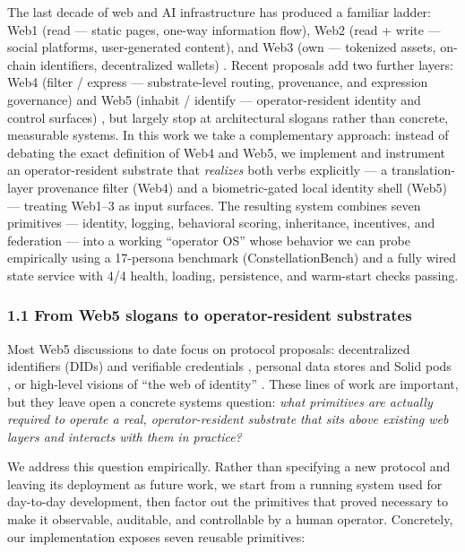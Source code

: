 The last decade of web and AI infrastructure has produced a familiar
ladder: Web1 (read --- static pages, one-way information flow), Web2
(read + write --- social platforms, user-generated content), and Web3
(own --- tokenized assets, on-chain identifiers, decentralized wallets)
\citep{bernerslee1989, oconnor2023web4}. Recent proposals add two
further layers: Web4 (filter / express --- substrate-level routing,
provenance, and expression governance) and Web5 (inhabit / identify ---
operator-resident identity and control surfaces)
\citep{tbd_web5, solid_pods, ssi_survey}, but largely stop at
architectural slogans rather than concrete, measurable systems. In this
work we take a complementary approach: instead of debating the exact
definition of Web4 and Web5, we implement and instrument an
operator-resident substrate that \emph{realizes} both verbs explicitly
--- a translation-layer provenance filter (Web4) and a biometric-gated
local identity shell (Web5) --- treating Web1--3 as input surfaces. The
resulting system combines seven primitives --- identity, logging,
behavioral scoring, inheritance, incentives, and federation --- into a
working ``operator OS'' whose behavior we can probe empirically using a
17-persona benchmark (ConstellationBench) and a fully wired state
service with 4/4 health, loading, persistence, and warm-start checks
passing.

\subsubsection{1.1 From Web5 slogans to operator-resident
substrates}\label{from-web5-slogans-to-operator-resident-substrates}

Most Web5 discussions to date focus on protocol proposals: decentralized
identifiers (DIDs) and verifiable credentials \citep{w3c_did_core},
personal data stores and Solid pods \citep{solid_pods}, or high-level
visions of ``the web of identity'' \citep{tbd_web5}. These lines of work
are important, but they leave open a concrete systems question:
\emph{what primitives are actually required to operate a real,
operator-resident substrate that sits above existing web layers and
interacts with them in practice?}

We address this question empirically. Rather than specifying a new
protocol and leaving its deployment as future work, we start from a
running system used for day-to-day development, then factor out the
primitives that proved necessary to make it observable, auditable, and
controllable by a human operator. Concretely, our implementation exposes
seven reusable primitives:

